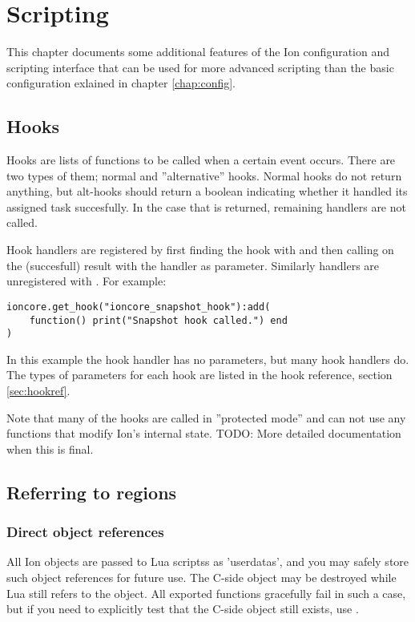 
\chapter{Scripting}
\label{chap:tricks}

This chapter documents some additional features of the Ion configuration
and scripting interface that can be used for more advanced scripting than
the basic configuration exlained in chapter \ref{chap:config}.

\section{Hooks}
\label{sec:hooks}

Hooks are lists of functions to be called when a certain event occurs.
There are two types of them; normal and ''alternative'' hooks. Normal
hooks do not return anything, but alt-hooks should return a boolean
indicating whether it handled its assigned task succesfully. In the case
that  is returned, remaining handlers are not called.

Hook handlers are registered by first finding the hook
with  and then calling 
on the (succesfull) result with the handler as parameter. Similarly
handlers are unregistered with . For example:

\begin{verbatim}
ioncore.get_hook("ioncore_snapshot_hook"):add(
    function() print("Snapshot hook called.") end
)
\end{verbatim}

In this example the hook handler has no parameters, but many hook
handlers do. The types of parameters for each hook are listed in
the hook reference, section \ref{sec:hookref}.


Note that many of the hooks are called in ''protected mode'' and can not 
use any functions that modify Ion's internal state. TODO: More detailed 
documentation when this is final.

\section{Referring to regions}

\subsection{Direct object references}

All Ion objects are passed to Lua scriptss as 'userdatas', and you may
safely store such object references for future use. The C-side object
may be destroyed while Lua still refers to the object. All exported
functions gracefully fail in such a case, but if you need to explicitly
test that the C-side object still exists, use .

